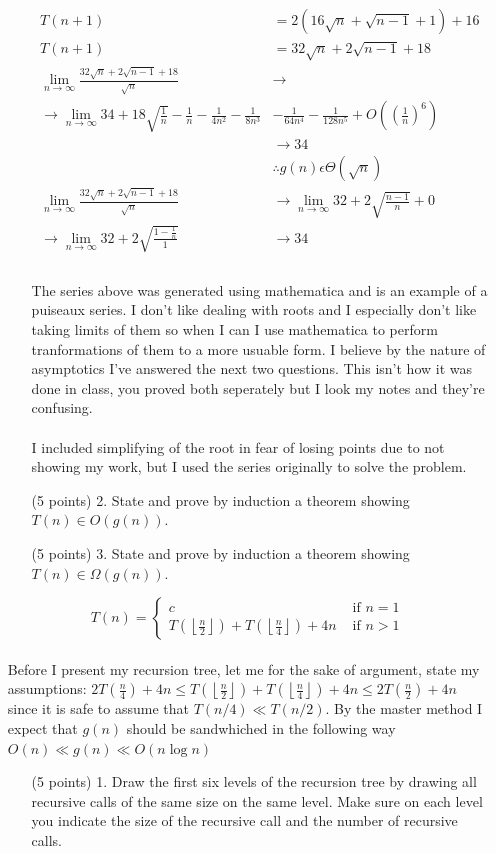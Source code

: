 \documentclass[paper=a4,fontsize=11pt]{article}
\begin{document}
\begin{enumerate}
\begin{enumerate}
\begin{align*}
T(n + 1) &= 2(16\sqrt{n} + \sqrt{n - 1} + 1) + 16\\
T(n + 1) &= 32\sqrt{n}+2\sqrt{n-1}+18\\
\lim_{n\to\infty}{\frac{32\sqrt{n}+2\sqrt{n-1}+18}{\sqrt{n}}} &\to\\
\to\lim_{n\to\infty}34 + 18\sqrt{\frac{1}{n}}-\frac{1}{n}-\frac{1}{4n^2}-\frac{1}{8n^3}&-\frac{1}{64n^4}-\frac{1}{128n^5}+O((\frac{1}{n})^{6})\\
&\to 34\\
&\therefore g(n)\epsilon \Theta(\sqrt{n})\\
\lim_{n\to\infty}{\frac{32\sqrt{n}+2\sqrt{n-1}+18}{\sqrt{n}}} &\to\lim_{n\to\infty}32 + 2\sqrt{\frac{n-1}{n}} +0\\
\to\lim_{n\to\infty}32+2\sqrt{\frac{1-\frac{1}{n}}{1}}&\to34\\
\end{align*}\\
The series above was generated using mathematica and is an example of a puiseaux series. I don't like dealing with roots and I especially don't like taking limits of them so when I can I use mathematica to perform tranformations of them to a more usuable form. I believe by the nature of asymptotics I've answered the next two questions. This isn't how it was done in class, you proved both seperately but I look my notes and they're confusing.\\\\
I included simplifying of the root in fear of losing points due to not showing my work, but I used the series originally to solve the problem.\\  
\item [(5 points) 2.] State and prove by induction a theorem showing $T (n) \in O(g(n))$.

\item [(5 points) 3.] State and prove by induction a theorem showing $T (n) \in \Omega(g(n))$.
\end{enumerate}
\[
T(n) = \left\{
\begin{array}{cl}
c & \textrm{ if } n = 1\\
T(\left\lfloor\frac{n}{2}\right\rfloor) + T(\left\lfloor\frac{n}{4}\right\rfloor) + 4n & \textrm{ if } n > 1
\end{array}
\right.
\]
\\Before I present my recursion tree, let me for the sake of argument, state my assumptions: $2T(\frac{n}{4})+4n \leq T(\left\lfloor\frac{n}{2}\right\rfloor) + T(\left\lfloor\frac{n}{4}\right\rfloor) + 4n \leq 2T(\frac{n}{2})+4n$ since it is safe to assume that $T(n/4) \ll T(n/2)$. By the master method I expect that $g(n)$ should be sandwhiched in the following way $O(n) \ll g(n) \ll O(n\log{n})$\\
\begin{enumerate}
\item [(5 points) 1.] Draw the first six levels of the recursion tree by drawing all recursive calls of the same size on the same level. Make sure on each level you indicate the size of the recursive call and the number of recursive calls.


\end{enumerate}
\end{enumerate}
\end{document}
